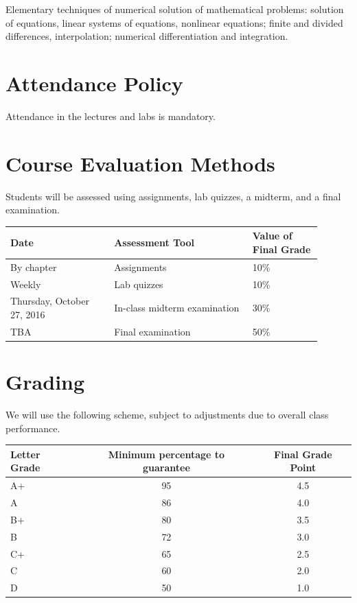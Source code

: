 \documentclass[12pt]{article}
\begin{document}
Elementary techniques of numerical solution of mathematical problems: solution of equations, linear systems of equations, nonlinear equations; finite and divided differences, interpolation; numerical differentiation and integration.

\section{Attendance Policy}

Attendance in the lectures and labs is mandatory.

\section{Course Evaluation Methods}

Students will be assessed using assignments, lab quizzes, a midterm, and a final examination.

\begin{center}
\begin{tabular}[t]{p{0.3\linewidth}p{0.4\linewidth}p{0.2\linewidth}}
\toprule
\mbox{}\newline \textbf{Date} &	\mbox{}\newline\textbf{Assessment Tool}	& \textbf{Value of \newline Final Grade} \\
\midrule
By chapter & Assignments & 10\% \\
Weekly & Lab quizzes & 10\% \\
Thursday, October 27, 2016 & In-class midterm examination & 30\% \\
TBA & Final examination & 50\% \\
\bottomrule
\end{tabular}
\end{center}

\section{Grading}

We will use the following scheme, subject to adjustments due to overall class performance.

\begin{center}
\begin{tabular}[t]{lcc}
\toprule
Letter Grade & Minimum percentage to guarantee & Final Grade Point  \\
\midrule
A+ & 95 & 4.5 \\
A & 86 & 4.0 \\
B+ & 80& 3.5 \\
B & 72 &  3.0 \\
C+ & 65  & 2.5 \\
C & 60 & 2.0 \\
D & 50& 1.0  \\
\bottomrule
\end{tabular}
\end{center}
\end{document}

